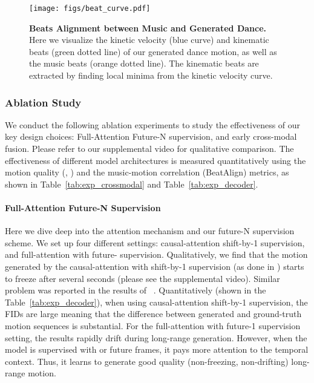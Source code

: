 \begin{figure}[t]
\vspace{-5mm}
\centering
\texttt{[image: figs/beat\_curve.pdf]}
\vspace{-3mm}
\caption{\textbf{Beats Alignment between Music and Generated Dance.} Here we visualize the kinetic velocity (blue curve) and kinematic beats (green dotted line) of our generated dance motion, as well as the music beats (orange dotted line). The kinematic beats are extracted by finding local minima from the kinetic velocity curve.
}
\label{fig:beat_curve}
\vspace{-5mm}
\end{figure} 
\vspace{-3mm}
\subsubsection{Ablation Study}
\label{sec:ablation_study}
We conduct the following ablation experiments to study the effectiveness of our key design choices: Full-Attention Future-N supervision, and early cross-modal fusion. Please refer to our supplemental video for qualitative comparison.
The effectiveness of different model architectures is measured quantitatively using the motion quality (\FIDk, \FIDm) and the music-motion correlation (BeatAlign) metrics, as shown in Table~\ref{tab:exp_crossmodal} and Table~\ref{tab:exp_decoder}.

\vspace{-3mm}
\paragraph{Full-Attention Future-N Supervision}
\label{sec:attn_comp}
Here we dive deep into the attention mechanism and our future-N supervision scheme.
We set up four different settings: causal-attention shift-by-1 supervision, and full-attention with future- supervision.
Qualitatively, we find that the motion generated by the causal-attention with shift-by-1 supervision {(as done in \cite{li2020learning, radford2018improving,aksan2020attention})
starts to freeze after several seconds (please see the supplemental video).
Similar problem was reported in the results of ~\cite{aksan2020attention}.
Quantitatively (shown in the Table~\ref{tab:exp_decoder}), when using causal-attention shift-by-1 supervision, the FIDs are large meaning that the difference between generated and ground-truth motion sequences is substantial.} 
For the full-attention with future-1 supervision setting, the results rapidly drift during long-range generation. 
However, when the model is supervised with  or  future frames, it pays more attention to the temporal context. Thus, it learns to generate good quality (non-freezing, non-drifting) long-range motion.

